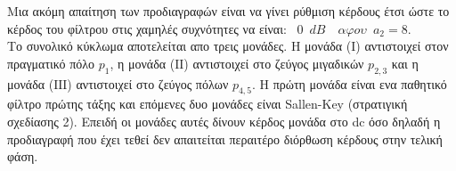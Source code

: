 \documentclass{article}
\begin{document}
 
\normalsize{}
Μια ακόμη απαίτηση των προδιαγραφών είναι να γίνει ρύθμιση κέρδους έτσι ώστε το κέρδος του φίλτρου
στις χαμηλές συχνότητες να είναι: $\boxed{\enspace 0 \enspace dB \enspace} \enspace αφου \enspace a_2 =8$. \\
Το συνολικό κύκλωμα αποτελείται απο τρεις μονάδες. Η μονάδα (Ι) αντιστοιχεί στον πραγματικό πόλο $p_1$, η μονάδα (ΙΙ) αντιστοιχεί στο ζεύγος μιγαδικών $p_{2,3}$ και η μονάδα (ΙΙΙ) αντιστοιχεί στο ζεύγος πόλων $p_{4,5}$. Η πρώτη μονάδα είναι ενα παθητικό φίλτρο πρώτης τάξης και επόμενες δυο μονάδες είναι Sallen-Key (στρατιγική σχεδίασης 2). Επειδή οι μονάδες αυτές δίνουν κέρδος μονάδα στο dc όσο δηλαδή η προδιαγραφή που έχει τεθεί δεν απαιτείται περαιτέρο διόρθωση κέρδους στην τελική φάση.\\[0.4\baselineskip]
\end{document}
